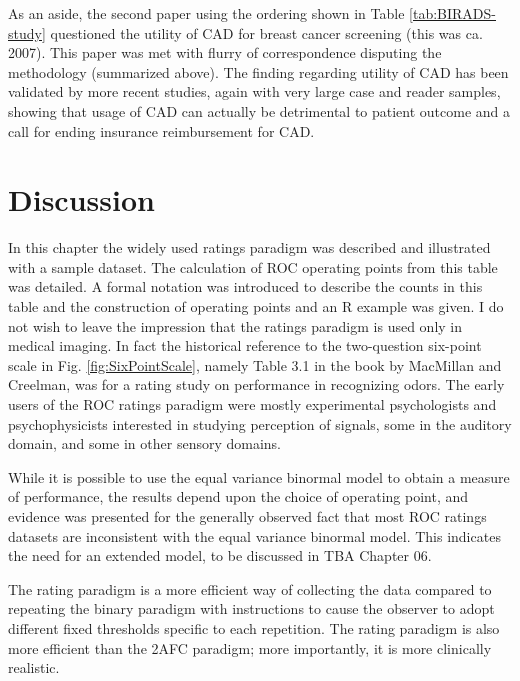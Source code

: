 \documentclass[
]{book}
\begin{document}
As an aside, the second paper \citep{fenton2007influence} using the ordering shown in Table \ref{tab:BIRADS-study} questioned the utility of CAD for breast cancer screening (this was ca. 2007). This paper was met with flurry of correspondence disputing the methodology (summarized above). The finding regarding utility of CAD has been validated by more recent studies, again with very large case and reader samples, showing that usage of CAD can actually be detrimental to patient outcome \citep{RN2321} and a call \citep{RN2404} for ending insurance reimbursement for CAD.

\hypertarget{ratings-paradigm-discussion}{%
\section{Discussion}\label{ratings-paradigm-discussion}}

In this chapter the widely used ratings paradigm was described and illustrated with a sample dataset. The calculation of ROC operating points from this table was detailed. A formal notation was introduced to describe the counts in this table and the construction of operating points and an R example was given. I do not wish to leave the impression that the ratings paradigm is used only in medical imaging. In fact the historical reference \citep{macmillan2004detection} to the two-question six-point scale in Fig. \ref{fig:SixPointScale}, namely Table 3.1 in the book by MacMillan and Creelman, was for a rating study on performance in recognizing odors. The early users of the ROC ratings paradigm were mostly experimental psychologists and psychophysicists interested in studying perception of signals, some in the auditory domain, and some in other sensory domains.

While it is possible to use the equal variance binormal model to obtain a measure of performance, the results depend upon the choice of operating point, and evidence was presented for the generally observed fact that most ROC ratings datasets are inconsistent with the equal variance binormal model. This indicates the need for an extended model, to be discussed in TBA Chapter 06.

The rating paradigm is a more efficient way of collecting the data compared to repeating the binary paradigm with instructions to cause the observer to adopt different fixed thresholds specific to each repetition. The rating paradigm is also more efficient than the 2AFC paradigm; more importantly, it is more clinically realistic.
\end{document}
